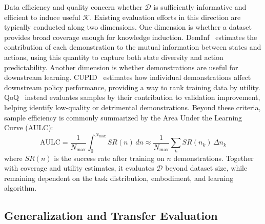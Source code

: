 \documentclass[acmsmall,screen,review]{acmart}
\begin{document}
Data efficiency and quality concern whether \(\mathcal{D}\) is sufficiently informative and efficient to induce useful \(\mathcal{K}\).
Existing evaluation efforts in this direction are typically conducted along two dimensions.
One dimension is whether a dataset provides broad coverage enough for knowledge induction. 
DemInf~\cite{hejna2025robot} estimates the contribution of each demonstration to the mutual information between states and actions, 
using this quantity to capture both state diversity and action predictability.
Another dimension is whether demonstrations are useful for downstream learning. 
CUPID~\cite{agia2025cupidcuratingdatarobot} estimates how individual demonstrations affect downstream policy performance, providing a way to rank training data by utility. 
QoQ~\cite{lee2026qoq} instead evaluates samples by their contribution to validation improvement, helping identify low-quality or detrimental demonstrations.
Beyond these criteria, sample efficiency is commonly summarized by the Area Under the Learning Curve (AULC):
\begin{equation}
\mathrm{AULC} = \frac{1}{N_{\max}} \int_0^{N_{\max}} SR(n)\, dn
\approx \frac{1}{N_{\max}} \sum_k SR(n_k)\,\Delta n_k
\end{equation}
where $SR(n)$ is the success rate after training on $n$ demonstrations. 
Together with coverage and utility estimates, it evaluates \(\mathcal{D}\) beyond dataset size, while remaining dependent on the task distribution, embodiment, and learning algorithm.

\subsection{Generalization and Transfer Evaluation}\label{sec:eval_benchmarking}
\end{document}
